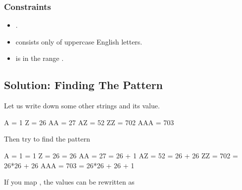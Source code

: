 \documentclass[letterpaper,12pt,english]{book}
\begin{document}
\subsubsection{Constraints}
\label{\detokenize{Mathematics/09_MTH_171_Excel_Sheet_Collumn_Number:constraints}}\begin{itemize}
\item {} 
\sphinxAtStartPar
{}.

\item {} 
\sphinxAtStartPar
{} consists only of uppercase English letters.

\item {} 
\sphinxAtStartPar
{} is in the range \sphinxcode{\sphinxupquote{{[}"A", "FXSHRXW"{]}}}.

\end{itemize}


\subsection{Solution: Finding The Pattern}
\label{\detokenize{Mathematics/09_MTH_171_Excel_Sheet_Collumn_Number:solution-finding-the-pattern}}
\sphinxAtStartPar
Let us write down some other  strings and its value.

\begin{sphinxVerbatim}[commandchars=\\\{\}]
\PYGZdq{}A\PYGZdq{}   =  1
\PYGZdq{}Z\PYGZdq{}   =  26
\PYGZdq{}AA\PYGZdq{}  =  27
\PYGZdq{}AZ\PYGZdq{}  =  52
\PYGZdq{}ZZ\PYGZdq{}  =  702
\PYGZdq{}AAA\PYGZdq{} =  703
\end{sphinxVerbatim}

\sphinxAtStartPar
Then try to find the pattern

\begin{sphinxVerbatim}[commandchars=\\\{\}]
\PYGZdq{}A\PYGZdq{}   =  1    =  1
\PYGZdq{}Z\PYGZdq{}   =  26   =  26
\PYGZdq{}AA\PYGZdq{}  =  27   =  26 + 1
\PYGZdq{}AZ\PYGZdq{}  =  52   =  26 + 26
\PYGZdq{}ZZ\PYGZdq{}  =  702  =  26*26 + 26
\PYGZdq{}AAA\PYGZdq{} =  703  =  26*26 + 26 + 1
\end{sphinxVerbatim}

\sphinxAtStartPar
If you map , the values can be rewritten as
\end{document}
